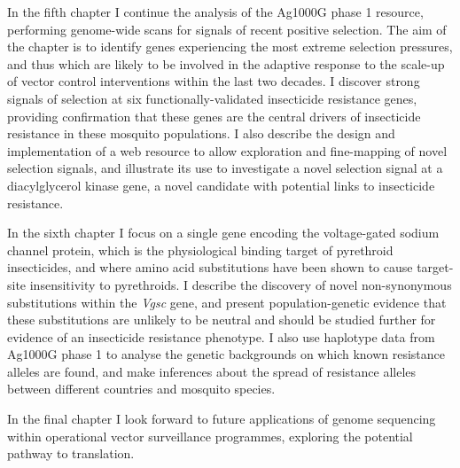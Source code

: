 \documentclass[a4paper,11pt,abstracton,hidelinks]{scrartcl}
\begin{document}
In the fifth chapter I continue the analysis of the Ag1000G phase 1 resource, performing genome-wide scans for signals of recent positive selection.
%
The aim of the chapter is to identify genes experiencing the most extreme selection pressures, and thus which are likely to be involved in the adaptive response to the scale-up of vector control interventions within the last two decades.
%
I discover strong signals of selection at six functionally-validated insecticide resistance genes, providing confirmation that these genes are the central drivers of insecticide resistance in these mosquito populations.
%
I also describe the design and implementation of a web resource to allow exploration and fine-mapping of novel selection signals, and illustrate its use to investigate a novel selection signal at a diacylglycerol kinase gene, a novel candidate with potential links to insecticide resistance.


In the sixth chapter I focus on a single gene encoding the voltage-gated sodium channel protein, which is the physiological binding target of pyrethroid insecticides, and where amino acid substitutions have been shown to cause target-site insensitivity to pyrethroids.
%
I describe the discovery of novel non-synonymous substitutions within the \textit{Vgsc} gene, and present population-genetic evidence that these substitutions are unlikely to be neutral and should be studied further for evidence of an insecticide resistance phenotype.
%
I also use haplotype data from Ag1000G phase 1 to analyse the genetic backgrounds on which known resistance alleles are found, and make inferences about the spread of resistance alleles between different countries and mosquito species.


In the final chapter I look forward to future applications of genome sequencing within operational vector surveillance programmes, exploring the potential pathway to translation. 



\printbibliography
\end{document}
